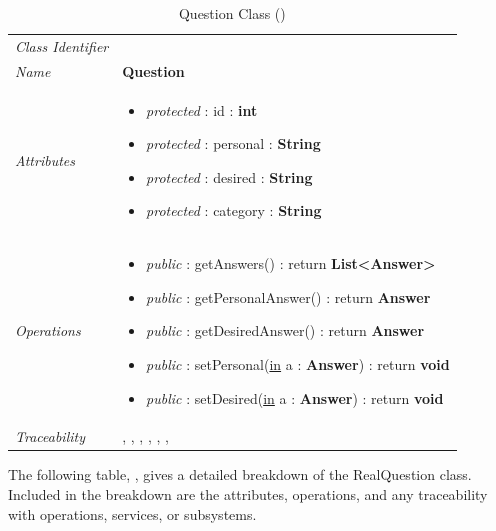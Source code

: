 \documentclass[12pt,letterpaper]{article}
\begin{document}
\begin{table}[H]
    \caption{Question Class ()} 
	\begin{tabu} to 
		\toprule
		Class Identifier &  \\
		Name & {\bf Question} \\
		Attributes & 
		\begin{minipage}[t]{\linewidth}
		    \begin{itemize}
		        \item \textit{protected} : id : {\bf int}
		        \item \textit{protected} : personal : {\bf String}
		        \item \textit{protected} : desired : {\bf String}
		        \item \textit{protected} : category : {\bf String}
			\end{itemize}
	    \end{minipage} \\

		Operations &
		\begin{minipage}[t]{\linewidth}
			\begin{itemize}
			    \item {\it public} : getAnswers() : return {\bf List<Answer>}
			    \item {\it public} : getPersonalAnswer() : return {\bf Answer}
			    \item {\it public} : getDesiredAnswer() : return {\bf Answer}
			    \item {\it public} : setPersonal(\underline{in} a : {\bf Answer}) : return {\bf void}
			    \item {\it public} : setDesired(\underline{in} a : {\bf Answer}) : return {\bf void}
	        \end{itemize}
	    \end{minipage} \\
	    	Traceability & , , , , , , \\
		\toprule
	\end{tabu}
\end{table}

\newpage{}
The following table, , gives a detailed breakdown of the RealQuestion class. Included in the breakdown are the attributes, operations, and any traceability with operations, services, or subsystems.
\end{document}
